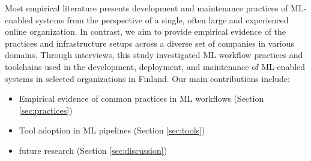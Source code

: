 Most empirical literature presents development and maintenance practices of ML-enabled systems from the perspective of a single, often large and experienced online organization. In contrast, we aim to provide empirical evidence of the practices and infrastructure setups across a diverse set of companies in various domains. Through interviews, this study investigated ML workflow practices and toolchains \DIFaddbegin {}\DIFaddend used in the development, deployment, and maintenance of ML-enabled systems in selected \DIFdelbegin {}\DIFdelend organizations in Finland. Our main contributions include:
\begin{itemize}
    \item Empirical evidence of common practices in ML workflows (Section \ref{sec:practices})\DIFaddbegin \DIFadd{,
    }\DIFaddend \item Tool adoption in ML pipelines (Section \ref{sec:tools})\DIFdelbegin {}\DIFdelend \DIFaddbegin {}\item {}\DIFaddend future research (Section \ref{sec:discussion})\DIFaddbegin {}\DIFaddend %
\DIFdelbegin %

\DIFdelend \end{itemize}


